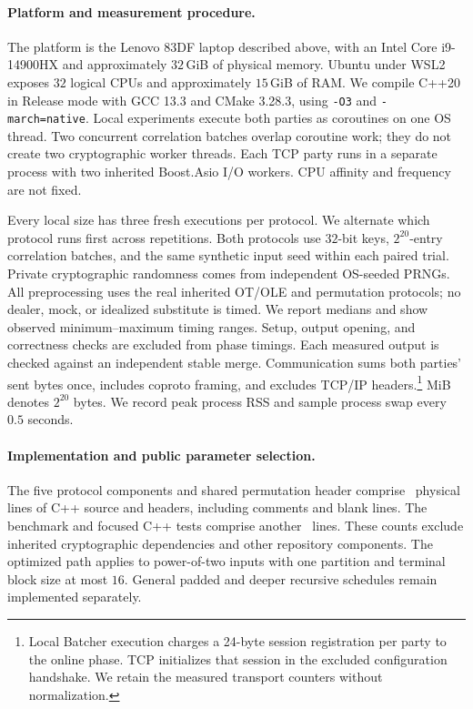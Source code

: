 \paragraph{Platform and measurement procedure.}
The platform is the Lenovo 83DF laptop described above, with an Intel Core
i9-14900HX and approximately $32$\,GiB of physical memory.
Ubuntu under WSL2 exposes $32$ logical CPUs and approximately $15$\,GiB of RAM.
We compile C++20 in Release mode with GCC 13.3 and CMake 3.28.3,
using \texttt{-O3} and \texttt{-march=native}.
Local experiments execute both parties as coroutines on one OS thread.
Two concurrent correlation batches overlap coroutine work; they do not create
two cryptographic worker threads. Each TCP party runs in a separate process
with two inherited Boost.Asio I/O workers. CPU affinity and frequency are not fixed.

Every local size has three fresh executions per protocol. We alternate which
protocol runs first across repetitions. Both protocols use $32$-bit keys,
$2^{20}$-entry correlation batches, and the same synthetic input seed within
each paired trial. Private cryptographic randomness comes from independent
OS-seeded PRNGs. All preprocessing uses the real inherited OT/OLE and permutation
protocols; no dealer, mock, or idealized substitute is timed.
We report medians and show observed minimum--maximum timing ranges.
Setup, output opening, and correctness checks are excluded from phase timings.
Each measured output is checked against an independent stable merge.
Communication sums both parties' sent bytes once, includes coproto framing,
and excludes TCP/IP headers.\footnote{Local Batcher execution charges a
24-byte session registration per party to the online phase. TCP initializes
that session in the excluded configuration handshake. We retain the measured
transport counters without normalization.} MiB denotes $2^{20}$ bytes.
We record peak process RSS and sample process swap every $0.5$ seconds.

\paragraph{Implementation and public parameter selection.}
The five protocol components and shared permutation header comprise
\packedLibraryLoc\ physical lines of
C++ source and headers, including comments and blank lines.
The benchmark and focused C++ tests comprise another \packedTestLoc\ lines.
These counts exclude inherited cryptographic dependencies and other repository
components. The optimized path applies to power-of-two inputs with one partition
and terminal block size at most $16$. General padded and deeper recursive schedules
remain implemented separately.

